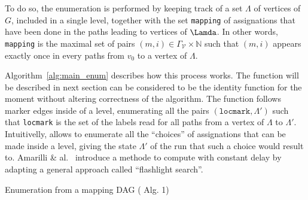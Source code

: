 \documentclass[12px]{article}
\theoremstyle{definition}
\begin{document}
        To do so, the enumeration is performed by keeping track of a set
        $\Lambda$ of vertices of $G$, included in a single level, together with
        the set \texttt{mapping} of assignations that have been done in the
        paths leading to vertices of $\Lamda$. In other words, \texttt{mapping}
        is the maximal set of pairs $(m, i) \in \Gamma_\mathcal{V} \times
        \mathbb{N}$ such that $(m, i)$ appears exactly once in every paths from
        $v_0$ to a vertex of $\Lambda$.

        Algorithm~\ref{alg:main_enum} describes how this process works. The
         function will be described in next section can be
        considered to be the identity function for the moment without altering
        correctness of the algorithm. The  function follows
        marker edges inside of a level, enumerating all the pairs
        $(\texttt{locmark}, \Lambda')$ such that \texttt{locmark} is the set of
        the labels read for all paths from a vertex of $\Lambda$ to $\Lambda'$.
        Intuitivelly,  allows to enumerate all the
        ``choices'' of assignations that can be made inside a level, giving the
        state $\Lambda'$ of the run that such a choice would result to.
        Amarilli \& al.~\cite{ICDT19} introduce a methode to compute
         with constant delay by adapting a general approach
        called ``flashlight search''.

        \begin{algorithm}[H]
          \caption{Enumeration from a mapping DAG (\cite{ICDT19} Alg. 1)}%
          \label{alg:main_enum}
          \begin{algorithmic}[1]
            \\
              \Else{}
                \EndFor{}
              \EndIf{}
            \EndFunction{}
            \\
            \EndFor{}
          \end{algorithmic}
        \end{algorithm}
\end{document}
